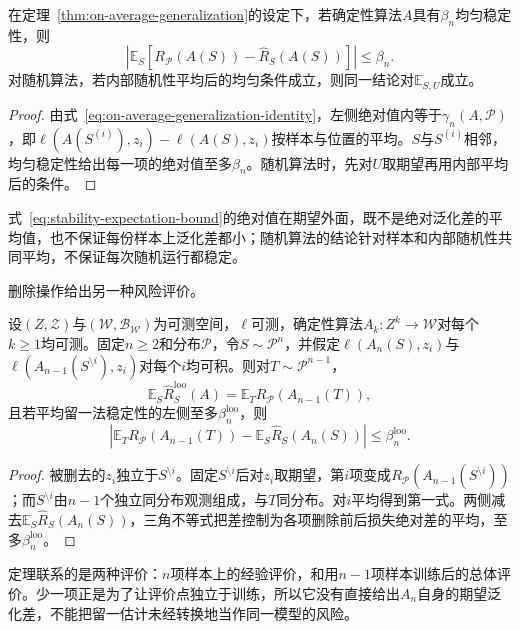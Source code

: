 \begin{theorem}[均匀稳定性与期望风险]
\label{thm:stability-expected-generalization}
在定理~\ref{thm:on-average-generalization}的设定下，若确定性算法$A$具有$\beta_n$均匀稳定性，则
\begin{equation}
 \left|\mathbb E_S\left[R_{\mathcal P}(A(S))-\hat R_S(A(S))\right]\right|\leq\beta_n.
 \label{eq:stability-expectation-bound}
\end{equation}
对随机算法，若内部随机性平均后的均匀条件成立，则同一结论对$\mathbb E_{S,U}$成立。
\end{theorem}
\begin{proof}
由式~\eqref{eq:on-average-generalization-identity}，左侧绝对值内等于$\gamma_n(A,\mathcal P)$，即$\ell(A(S^{(i)}),z_i)-\ell(A(S),z_i)$按样本与位置的平均。$S$与$S^{(i)}$相邻，均匀稳定性给出每一项的绝对值至多$\beta_n$。随机算法时，先对$U$取期望再用内部平均后的条件。
\end{proof}

式~\eqref{eq:stability-expectation-bound}的绝对值在期望外面，既不是绝对泛化差的平均值，也不保证每份样本上泛化差都小；随机算法的结论针对样本和内部随机性共同平均，不保证每次随机运行都稳定。

删除操作给出另一种风险评价。

\begin{theorem}[留一法稳定性与期望风险]
\label{thm:loo-risk}
设$(Z,\mathcal Z)$与$(\mathcal W,\mathcal B_{\mathcal W})$为可测空间，$\ell$可测，确定性算法$A_k:Z^k\to\mathcal W$对每个$k\geq1$均可测。固定$n\geq2$和分布$\mathcal P$，令$S\sim\mathcal P^n$，并假定$\ell(A_n(S),z_i)$与$\ell(A_{n-1}(S^{\setminus i}),z_i)$对每个$i$均可积。则对$T\sim\mathcal P^{n-1}$，
\[
 \mathbb E_S\hat R_S^{\mathrm{loo}}(A)=\mathbb E_TR_{\mathcal P}(A_{n-1}(T)),
\]
且若平均留一法稳定性的左侧至多$\beta_n^{\mathrm{loo}}$，则
\[
 \left|\mathbb E_T R_{\mathcal P}(A_{n-1}(T))-\mathbb E_S\hat R_S(A_n(S))\right|\leq\beta_n^{\mathrm{loo}}.
\]
\end{theorem}
\begin{proof}
被删去的$z_i$独立于$S^{\setminus i}$。固定$S^{\setminus i}$后对$z_i$取期望，第$i$项变成$R_{\mathcal P}(A_{n-1}(S^{\setminus i}))$；而$S^{\setminus i}$由$n-1$个独立同分布观测组成，与$T$同分布。对$i$平均得到第一式。两侧减去$\mathbb E_S\hat R_S(A_n(S))$，三角不等式把差控制为各项删除前后损失绝对差的平均，至多$\beta_n^{\mathrm{loo}}$。
\end{proof}

定理联系的是两种评价：$n$项样本上的经验评价，和用$n-1$项样本训练后的总体评价。少一项正是为了让评价点独立于训练，所以它没有直接给出$A_n$自身的期望泛化差，不能把留一估计未经转换地当作同一模型的风险。

